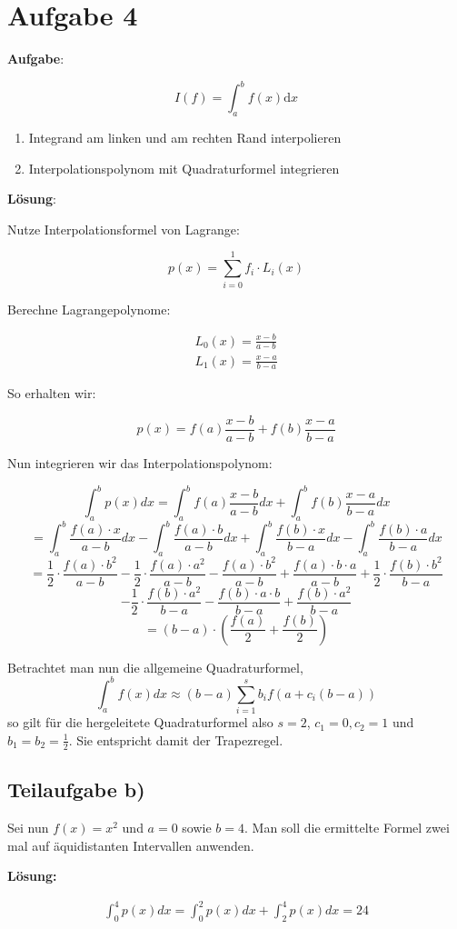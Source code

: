 \section*{Aufgabe 4}
\textbf{Aufgabe}: 

\[I(f) = \int_a^b f(x) \mathrm{d}x \]

\begin{enumerate}
    \item Integrand am linken und am rechten Rand interpolieren
	\item Interpolationspolynom mit Quadraturformel integrieren
\end{enumerate}

\textbf{Lösung}:

Nutze Interpolationsformel von Lagrange:

\[p(x) = \sum_{i=0}^{1} f_i \cdot L_i(x)\]

Berechne Lagrangepolynome:

\begin{align}
    L_0(x) = \frac{x-b}{a-b} \\
    L_1(x) = \frac{x-a}{b-a}
\end{align}

So erhalten wir:

\[p(x) = f(a) \frac{x-b}{a-b} + f(b) \frac{x-a}{b-a}\]

Nun integrieren wir das Interpolationspolynom:

\[ \int_a^b p(x)dx = \int_a^b f(a) \frac{x-b}{a-b}dx + \int_a^b f(b) \frac{x-a}{b-a}dx \]
\[ = \int_a^b \frac{f(a) \cdot x}{a-b}dx - \int_a^b \frac{f(a) \cdot b}{a-b}dx + \int_a^b \frac{f(b) \cdot x}{b-a}dx - \int_a^b \frac{f(b) \cdot a}{b-a}dx \]
\[ = \frac{1}{2} \cdot \frac{f(a) \cdot b^2}{a-b} - \frac{1}{2} \cdot \frac{f(a) \cdot a^2}{a-b} - \frac{f(a) \cdot b^2}{a-b} + \frac{f(a) \cdot b \cdot a}{a-b} + \frac{1}{2} \cdot \frac{f(b) \cdot b^2}{b-a} \]
\[ - \frac{1}{2} \cdot \frac{f(b) \cdot a^2}{b-a} - \frac{f(b) \cdot a \cdot b}{b-a} + \frac{f(b) \cdot a^2}{b-a}\]
\[=(b-a)\cdot(\frac{f(a)}{2} + \frac{f(b)}{2})\]

Betrachtet man nun die allgemeine Quadraturformel,
\[
\int_a^b f(x)dx \approx (b-a) \sum_{i=1}^s b_i f(a+c_i(b-a))
\]
so gilt für die hergeleitete Quadraturformel also $s=2$, $c_1=0, c_2=1$ und $b_1 = b_2 = \frac{1}{2}$. Sie entspricht damit der Trapezregel.

\subsection*{Teilaufgabe b)}
Sei nun $f(x) = x^2$ und $a = 0$ sowie $b = 4$. Man soll die ermittelte
Formel zwei mal auf äquidistanten Intervallen anwenden.

\textbf{Lösung:}

\begin{align}
	\int_0^4 p(x) dx = \int_0^2 p(x)dx + \int_2^4 p(x)dx = 24
\end{align}
